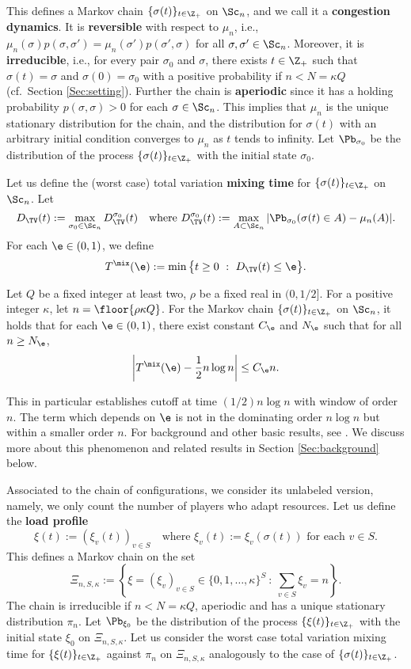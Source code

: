 \documentclass[12pt, reqno]{amsart}
\begin{document}
This defines a Markov chain $\{\sigma(t)\}_{t \in \Z_+}$ on $\Sc_n$,
and we call it a {\bf congestion dynamics}.
It is {\bf reversible} with respect to $\mu_n$,
i.e.,
$\mu_n(\sigma)p(\sigma, \sigma')=\mu_n(\sigma')p(\sigma', \sigma)$
for all $\sigma, \sigma' \in \Sc_n$.
Moreover, it is {\bf irreducible},
i.e.,
for every pair $\sigma_0$ and $\sigma$,
there exists $t \in \Z_+$
such that $\sigma(t)=\sigma$ and $\sigma(0)=\sigma_0$ with a positive probability
if $n<N=\kappa Q$ (cf.\ Section \ref{Sec:setting}).
Further the chain is {\bf aperiodic} since it has a holding probability $p(\sigma, \sigma)>0$
for each $\sigma\in \Sc_n$.
This implies that $\mu_n$ is the unique stationary distribution for the chain,
and the distribution for $\sigma(t)$ with an arbitrary initial condition converges to $\mu_n$
as $t$ tends to infinity.
Let $\Pb_{\sigma_0}$ be the distribution of the process $\{\sigma(t)\}_{t\in \Z_+}$ with the initial state $\sigma_0$.



Let us define the (worst case) total variation {\bf mixing time} for $\{\sigma(t)\}_{t \in \Z_+}$ on $\Sc_n$.
Let
\[
D_\TV(t):=\max_{\sigma_0 \in \Sc_n} D_\TV^{\sigma_0}(t) \quad \text{where $D_\TV^{\sigma_0}(t):=\max_{A \subset \Sc_n}|\Pb_{\sigma_0}(\sigma(t)\in A)-\mu_n(A)|$}.
\]
For each $\e \in (0, 1)$, 
we define
\[
T^\mix(\e):=\min\big\{t \ge 0 \ : \ D_\TV(t)\le \e\big\}.
\]


\begin{theorem}\label{Thm:Gibbs}
Let $Q$ be a fixed integer at least two, $\rho$ be a fixed real in $(0, 1/2]$.
For a positive integer $\kappa$, let $n=\floor{\rho \kappa Q}$.
For the Markov chain $\{\sigma(t)\}_{t\in \Z_+}$ on $\Sc_n$,
it holds that for each $\e \in (0, 1)$,
there exist constant $C_\e$ and $N_\e$ such that for all $n \ge N_\e$,
\[
\left|T^\mix(\e)-\frac{1}{2}n\log n\right|\le C_\e n.
\]
\end{theorem}


This in particular establishes cutoff at time $(1/2)n\log n$ with window of order $n$.
The term which depends on $\e$ is not in the dominating order $n\log n$ but within a smaller order $n$.
For background and other basic results, see \cite[Chapter 18]{LP}.
We discuss more about this phenomenon and related results in Section \ref{Sec:background} below.


Associated to the chain of configurations,
we consider its unlabeled version,
namely,
we only count the number of players who adapt resources.
Let us define the {\bf load profile}
\[
\xi(t):=(\xi_v(t))_{v \in S} \quad \text{where $\xi_v(t):=\xi_v(\sigma(t))$ for each $v \in S$}.
\]
This defines a Markov chain on the set
\[
\Xi_{n, S, \kappa}:=\left\{\xi=(\xi_v)_{v\in S}\in \{0, 1, \dots, \kappa\}^S \ : \ \sum_{v \in S}\xi_v=n\right\}.
\]
The chain is irreducible if $n<N=\kappa Q$,
aperiodic and has a unique stationary distribution $\pi_n$.
Let $\Pb_{\xi_0}$ be the distribution of the process $\{\xi(t)\}_{t\in \Z_+}$ with the initial state $\xi_0$ on $\Xi_{n, S, \kappa}$.
Let us consider the worst case total variation mixing time for $\{\xi(t)\}_{t \in \Z_+}$ against $\pi_n$ on $\Xi_{n, S, \kappa}$ analogously to the case of $\{\sigma(t)\}_{t\in \Z_+}$.
\end{document}
